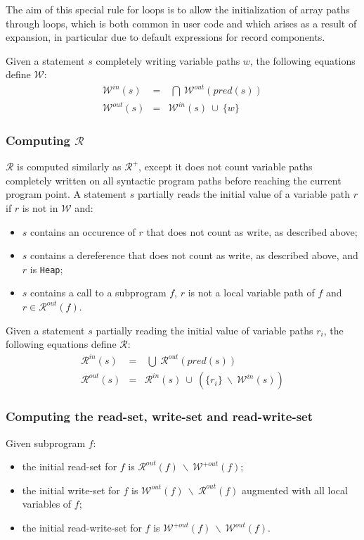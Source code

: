 \documentclass{article}
\newcommand{\code}[1]{\texttt{#1}}
\newcommand{\heap}{\code{Heap}\xspace}
\newcommand{\pred}[1]{\ensuremath{\mathit{pred}(#1)}\xspace}
\newcommand{\outallwrites}[1]{\ensuremath{\mathcal{W}^{+out}(#1)}\xspace}
\newcommand{\writes}{$\mathcal{W}$\xspace}
\newcommand{\inwrites}[1]{\ensuremath{\mathcal{W}^{in}(#1)}\xspace}
\newcommand{\outwrites}[1]{\ensuremath{\mathcal{W}^{out}(#1)}\xspace}
\newcommand{\allreads}{$\mathcal{R^+}$\xspace}
\newcommand{\reads}{$\mathcal{R}$\xspace}
\newcommand{\inreads}[1]{\ensuremath{\mathcal{R}^{in}(#1)}\xspace}
\newcommand{\outreads}[1]{\ensuremath{\mathcal{R}^{out}(#1)}\xspace}
\newcommand{\union}{~\cup~}
\newcommand{\bigunion}{~\bigcup~}
\newcommand{\biginter}{~\bigcap~}
\newcommand{\minus}{~\backslash~}
\begin{document}
The aim of this special rule for loops is to allow the initialization of array
paths through loops, which is both common in user code and which arises as a
result of expansion, in particular due to default expressions for record
components.

Given a statement $s$ completely writing variable paths $w$, the following
equations define \writes:
\begin{eqnarray*}
\inwrites{s} &=& \biginter \outwrites{\pred{s}}\\
\outwrites{s} &=& \inwrites{s} \union \{w\}
\end{eqnarray*}

\subsubsection{Computing \reads}

\reads is computed similarly as \allreads, except it does not count variable
paths completely written on all syntactic program paths before reaching the
current program point. A statement $s$ partially reads the initial value of a
variable path $r$ if $r$ is not in \writes and:
\begin{itemize}
\item $s$ contains an occurence of $r$ that does not count as write, as
  described above;
\item $s$ contains a dereference that does not count as write, as described
  above, and $r$ is \heap;
\item $s$ contains a call to a subprogram $f$, $r$ is not a local variable path
  of $f$ and $r \in \outreads{f}$.
\end{itemize}

Given a statement $s$ partially reading the initial value of variable paths
$r_i$, the following equations define \reads:
\begin{eqnarray*}
\inreads{s} &=& \bigunion \outreads{\pred{s}}\\
\outreads{s} &=& \inreads{s} \union (\{r_i\} \minus \inwrites{s})
\end{eqnarray*}

\subsubsection{Computing the read-set, write-set and read-write-set}

Given subprogram $f$:
\begin{itemize}
\item the initial read-set for $f$ is $\outreads{f} \minus \outallwrites{f}$;
\item the initial write-set for $f$ is $\outwrites{f} \minus \outreads{f}$
  augmented with all local variables of $f$;
\item the initial read-write-set for $f$ is $\outallwrites{f} \minus
  \outwrites{f}$.
\end{itemize}
\end{document}
